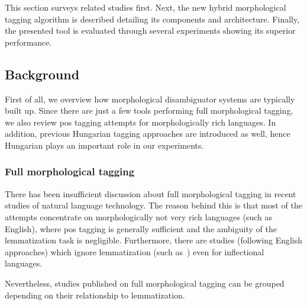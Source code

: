 This section surveys related studies first. 
Next, the new hybrid morphological tagging algorithm is described detailing its components and architecture. 
Finally, the presented tool is evaluated through several experiments showing its superior performance.

\subsection{Background}

First of all, we overview how morphological disambiguator systems are typically built up. 
Since there are just a few tools performing full morphological tagging, we also review \gls{pos} tagging attempts for morphologically rich languages. 
In addition, previous Hungarian tagging approaches are introduced as well, hence Hungarian plays an important role in our experiments.

\subsubsection{Full morphological tagging}

There has been insufficient discussion about full morphological tagging in recent studies of natural language technology. 
The reason behind this is that most of the attempts concentrate on morphologically not very rich languages (such as English), where \gls{pos} tagging is generally sufficient and the ambiguity of the lemmatization task is negligible. 
Furthermore, there are studies (following English approaches) which ignore lemmatization (such as~\cite{Hajic1998a,Tufis1998,Silfverberg2011}) even for inflectional languages. 

Nevertheless, studies published on full morphological tagging can be grouped depending on their relationship to lemmatization.

